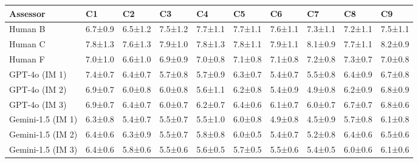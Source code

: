 \begin{table*}[]
    \small
    \centering

\begin{tabular}{llllllllll}
\toprule
         Assessor &             C1 &             C2 &             C3 &             C4 &             C5 &             C6 &             C7 &             C8 &             C9 \\
\midrule
             Human B & 6.7{\tiny±0.9} & 6.5{\tiny±1.2} & 7.5{\tiny±1.2} & 7.7{\tiny±1.1} & 7.7{\tiny±1.1} & 7.6{\tiny±1.1} & 7.3{\tiny±1.1} & 7.2{\tiny±1.1} & 7.5{\tiny±1.1} \\
               
              Human C & 7.8{\tiny±1.3} & 7.6{\tiny±1.3} & 7.9{\tiny±1.0} & 7.8{\tiny±1.3} & 7.8{\tiny±1.1} & 7.9{\tiny±1.1} & 8.1{\tiny±0.9} & 7.7{\tiny±1.1} & 8.2{\tiny±0.9} \\ 

              Human F & 7.0{\tiny±1.0} & 6.6{\tiny±1.0} & 6.9{\tiny±0.9} & 7.0{\tiny±0.8} & 7.1{\tiny±0.8} & 7.1{\tiny±0.8} & 7.2{\tiny±0.8} & 7.3{\tiny±0.7} & 7.0{\tiny±0.8} \\ \midrule
               
    GPT-4o (IM 1) & 7.4{\tiny±0.7} & 6.4{\tiny±0.7} & 5.7{\tiny±0.8} & 5.7{\tiny±0.9} & 6.3{\tiny±0.7} & 5.4{\tiny±0.7} & 5.5{\tiny±0.8} & 6.4{\tiny±0.9} & 6.7{\tiny±0.8} \\
    GPT-4o (IM 2) & 6.9{\tiny±0.7} & 6.0{\tiny±0.8} & 6.0{\tiny±0.8} & 5.6{\tiny±1.1} & 6.2{\tiny±0.8} & 5.4{\tiny±0.9} & 4.9{\tiny±0.8} & 6.2{\tiny±0.9} & 6.8{\tiny±0.9} \\
    GPT-4o (IM 3) & 6.9{\tiny±0.7} & 6.4{\tiny±0.7} & 6.0{\tiny±0.7} & 6.2{\tiny±0.7} & 6.4{\tiny±0.6} & 6.1{\tiny±0.7} & 6.0{\tiny±0.7} & 6.7{\tiny±0.7} & 6.8{\tiny±0.6} \\ \midrule
    
Gemini-1.5 (IM 1) & 6.3{\tiny±0.8} & 5.4{\tiny±0.7} & 5.5{\tiny±0.7} & 5.5{\tiny±1.0} & 6.0{\tiny±0.8} & 4.9{\tiny±0.8} & 4.5{\tiny±0.9} & 5.7{\tiny±0.8} & 6.1{\tiny±0.8} \\
Gemini-1.5 (IM 2) & 6.4{\tiny±0.6} & 6.3{\tiny±0.9} & 5.5{\tiny±0.7} & 5.8{\tiny±0.8} & 6.0{\tiny±0.5} & 5.4{\tiny±0.7} & 5.2{\tiny±0.8} & 6.4{\tiny±0.6} & 6.5{\tiny±0.6} \\
Gemini-1.5 (IM 3) & 6.4{\tiny±0.6} & 5.8{\tiny±0.6} & 5.5{\tiny±0.6} & 5.6{\tiny±0.5} & 5.7{\tiny±0.5} & 5.5{\tiny±0.6} & 5.4{\tiny±0.5} & 6.0{\tiny±0.6} & 6.1{\tiny±0.6} \\ \midrule


\end{tabular}
\end{table*}
